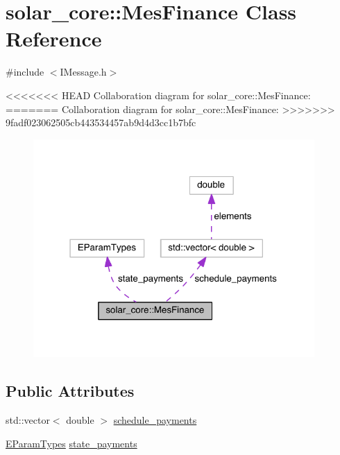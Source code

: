 \hypertarget{classsolar__core_1_1_mes_finance}{}\section{solar\+\_\+core\+:\+:Mes\+Finance Class Reference}
\label{classsolar__core_1_1_mes_finance}


{\ttfamily \#include $<$I\+Message.\+h$>$}



<<<<<<< HEAD
Collaboration diagram for solar\+\_\+core\+:\+:Mes\+Finance\+:\nopagebreak
=======
Collaboration diagram for solar\+\_\+core\+:\+:Mes\+Finance\+:
\nopagebreak
>>>>>>> 9fadf023062505cb443534457ab9d4d3cc1b7bfc
\begin{figure}[H]
\begin{center}
\leavevmode
\includegraphics[width=304pt]{classsolar__core_1_1_mes_finance__coll__graph}
\end{center}
\end{figure}
\subsection*{Public Attributes}
\begin{DoxyCompactItemize}
\item 
std\+::vector$<$ double $>$ \hyperlink{classsolar__core_1_1_mes_finance_aa5f0c5370821ad09da5aea0da9c03a29}{schedule\+\_\+payments}
\item 
\hyperlink{namespacesolar__core_aa1147341e5ef7a40d68d1bd68e149362}{E\+Param\+Types} \hyperlink{classsolar__core_1_1_mes_finance_a5411785779f982be49c7e14584ce2fe2}{state\+\_\+payments}
\end{DoxyCompactItemize}


